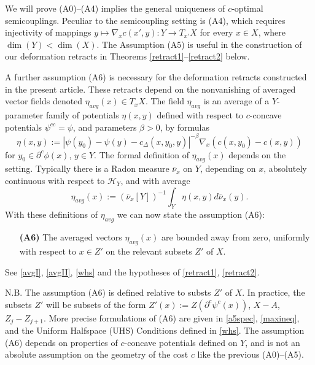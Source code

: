 \documentclass[12pt]{amsart}
\theoremstyle{definition}
\theoremstyle{remark}
\newcommand{\del}{\partial}
\newcommand{\cd}{c_\Delta}
\begin{document}
We will prove (A0)--(A4) implies the general uniqueness of $c$-optimal semicouplings. Peculiar to the semicoupling setting is (A4), which requires injectivity of mappings $y\mapsto \nabla_x c(x',y):Y\to T_{x'} X$ for every $x\in X$, where $\dim(Y)< \dim(X)$. The Assumption (A5) is useful in the construction of our deformation retracts in Theorems \ref{retract1}--\ref{retract2} below. 

A further assumption (A6) is necessary for the deformation retracts constructed in the present article. These retracts depend on the nonvanishing of averaged vector fields denoted $\eta_{avg}(x) \in T_x X$. The field $\eta_{avg}$ is an average of a $Y$-parameter family of potentials $\eta(x,y)$ defined with respect to $c$-concave potentials $\psi^{cc}=\psi$, and parameters $\beta>0$, by formulas\begin{equation}\label{introetaavg}
\eta(x,y):=|\psi(y_0)-\psi(y)-\cd(x,y_0,y)|^{-\beta} \nabla_x (c(x,y_0)-c(x,y)) 
\end{equation} for $y_0\in \del^c \phi(x)$, $y\in Y$. %
The formal definition of $\eta_{avg}(x)$ depends on the setting. Typically there is a Radon measure $\bar{\nu}_x$ on $Y$, depending on $x$, absolutely continuous with respect to $\mathscr{H}_Y$, and with average \begin{equation}\label{introavg}
\eta_{avg}(x):=(\bar{\nu}_x[Y])^{-1} \int_Y \eta(x,y)d\bar{\nu}_x(y).
\end{equation}
With these definitions of $\eta_{avg}$ we can now state the assumption (A6): 
\begin{itemize}
\item[\textbf{(A6)}] 
The averaged vectors $\eta_{avg}(x)$ are bounded away from zero, uniformly with respect to $x\in Z'$ on the relevant subsets $Z'$ of $X$.
\end{itemize}
See \eqref{avgI}, \eqref{avgII}, \ref{whs} and the hypotheses of \ref{retract1}, \ref{retract2}. 

N.B. The assumption (A6) is defined relative to substs $Z'$ of $X$. In practice, the subsets $Z'$ will be  subsets of the form $Z'(x):=Z(\del^c \psi^c(x))$, $X-A$, $Z_j - Z_{j+1}$. More precise formulations of (A6) are given in \ref{a5spec}, \eqref{maxineq}, and the Uniform Halfspace (UHS) Conditions defined in \ref{whs}. The assumption (A6) depends on properties of $c$-concave potentials defined on $Y$, and is not an absolute assumption on the geometry of the cost $c$ like the previous (A0)--(A5). 
\end{document}
